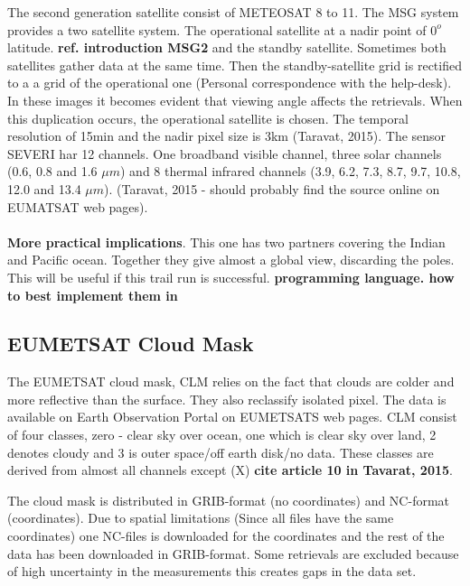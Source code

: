 The second generation satellite consist of METEOSAT 8 to 11. The MSG system provides a two satellite system. The operational satellite at a nadir point of $0^o$ latitude. \textbf{ref. introduction MSG2} and the standby satellite. Sometimes both satellites gather data at the same time. Then the standby-satellite grid is rectified to a a grid of the operational one (Personal correspondence with the help-desk). In these images it becomes evident that viewing angle affects the retrievals. When this duplication occurs, the operational satellite is chosen. The temporal resolution of 15min and the nadir pixel size is 3km (Taravat, 2015). The sensor SEVERI har 12 channels. One broadband visible channel, three solar channels (0.6, 0.8 and 1.6 $\mu m$) and 8 thermal infrared channels (3.9, 6.2, 7.3, 8.7, 9.7, 10.8, 12.0 and 13.4 $\mu m$). (Taravat, 2015 - should probably find the source online on EUMATSAT web pages).
\\ \\ 
\textbf{More practical implications}. This one has two partners covering the Indian and Pacific ocean. Together they give almost a global view, discarding the poles. This will be useful if this trail run is successful.  \textbf{programming language. how to best implement them in }

\subsection{EUMETSAT Cloud Mask} \label{sec:EUMETSAT_cloud_mask}
The EUMETSAT cloud mask, CLM relies on the fact that clouds are colder and more reflective than the surface. They also reclassify isolated pixel. The data is available on Earth Observation Portal on EUMETSATS web pages. CLM consist of four classes, zero - clear sky over ocean, one which is clear sky over land, 2 denotes cloudy and 3 is outer space/off earth disk/no data. These classes are derived from almost all channels except (X) \textbf{cite article 10 in Tavarat, 2015}.

The cloud mask is distributed in GRIB-format (no coordinates) and NC-format (coordinates). Due to spatial limitations (Since all files have the same coordinates) one NC-files is downloaded for the coordinates and the rest of the data has been downloaded in GRIB-format. Some retrievals are excluded because of high uncertainty in the measurements this creates gaps in the data set. 

